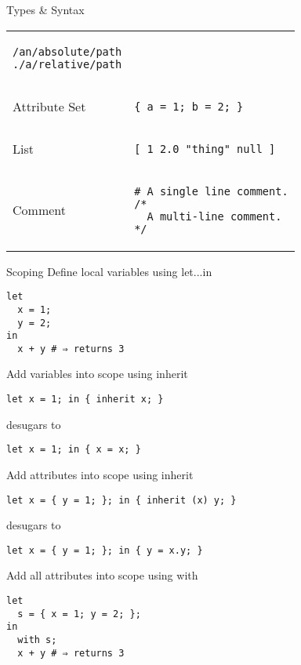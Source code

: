 \documentclass[landscape, 10pt]{article}
\begin{document}
\begin{multicols*}{3}
\begin{ctexpression}{Types \& Syntax}
\begin{tabular}{l p{}}
\begin{minipage}{0.5\textwidth}
\begin{verbatim}
/an/absolute/path
./a/relative/path
            \end{verbatim}
        \end{minipage}
        \\
        Attribute Set &
        \begin{minipage}{0.5\textwidth}
            \begin{verbatim}
{ a = 1; b = 2; }
            \end{verbatim}
        \end{minipage}
        \\
        List &
        \begin{minipage}{0.5\textwidth}
            \begin{verbatim}
[ 1 2.0 "thing" null ]
            \end{verbatim}
        \end{minipage}
        \\
        Comment &
        \begin{minipage}{0.5\textwidth}
            \begin{verbatim}
# A single line comment.
/*
  A multi-line comment.
*/
            \end{verbatim}
        \end{minipage}
    \end{tabular}
\end{ctexpression}

\vfill

\begin{ctexpression}{Scoping}
{\color{nixdarkblue}Define local variables using} let...in
    \begin{verbatim}
let
  x = 1;
  y = 2;
in
  x + y # ⇒ returns 3
    \end{verbatim}
    \tcbline
{\color{nixdarkblue}Add variables into scope using} inherit
    \begin{verbatim}
let x = 1; in { inherit x; }
    \end{verbatim}
{\color{nixdarkblue}desugars to}
    \begin{verbatim}
let x = 1; in { x = x; }
    \end{verbatim}
    \tcbline
{\color{nixdarkblue}Add attributes into scope using} inherit
    \begin{verbatim}
let x = { y = 1; }; in { inherit (x) y; }
    \end{verbatim}
{\color{nixdarkblue}desugars to}
    \begin{verbatim}
let x = { y = 1; }; in { y = x.y; }
    \end{verbatim}
    \tcbline
{\color{nixdarkblue}Add all attributes into scope using} with
    \begin{verbatim}
let
  s = { x = 1; y = 2; };
in
  with s;
  x + y # ⇒ returns 3
    \end{verbatim}
\end{ctexpression}


\end{multicols*}
\end{document}
